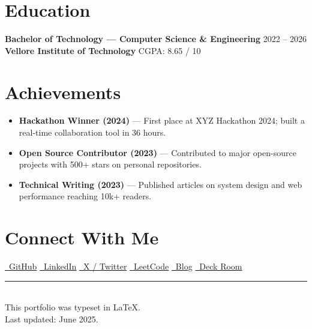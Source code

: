 \documentclass[11pt, a4paper]{article}
\begin{document}
\section{\faGraduationCap\enspace Education}

{\large\bfseries\color{darkbg} Bachelor of Technology — Computer Science \& Engineering}%
\hfill{\small\color{lightgray} 2022 -- 2026}\\[1pt]
{\color{accent}\bfseries Vellore Institute of Technology}%
\hfill{\small\color{lightgray} CGPA: 8.65 / 10}

\section{\faTrophy\enspace Achievements}

\begin{itemize}
  \item \textbf{Hackathon Winner (2024)} — First place at XYZ Hackathon 2024; built a real-time collaboration tool in 36 hours.
  \item \textbf{Open Source Contributor (2023)} — Contributed to major open-source projects with 500+ stars on personal repositories.
  \item \textbf{Technical Writing (2023)} — Published articles on system design and web performance reaching 10k+ readers.
\end{itemize}

\section{\faLink\enspace Connect With Me}

\begin{center}
  \large
  \href{https://github.com/akhilthirunalveli}{\faGithub\ GitHub}%
  \enspace\textbar\enspace%
  \href{https://linkedin.com/in/akhilthirunalveli}{\faLinkedin\ LinkedIn}%
  \enspace\textbar\enspace%
  \href{https://x.com/archivebyakhil}{\faXTwitter\ X / Twitter}%
  \enspace\textbar\enspace%
  \href{https://leetcode.com/akhilthirunalveli}{\faCode\ LeetCode}%
  \enspace\textbar\enspace%
  \href{https://blog.akhil.world}{\faPen\ Blog}%
  \enspace\textbar\enspace%
  \href{https://presentations.akhil.world}{\faDesktop\ Deck Room}%
\end{center}

\vfill

\begin{center}
  \small\color{lightgray}
  \rule{0.4\textwidth}{0.4pt}\\[4pt]
  This portfolio was typeset in \LaTeX.\\
  Last updated: June 2025.
\end{center}
\end{document}
